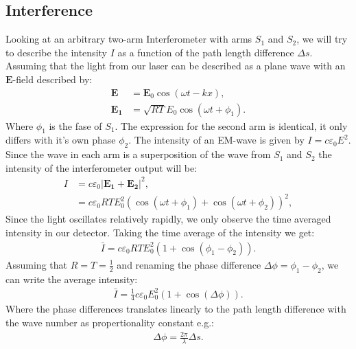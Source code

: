 \subsection{Interference}
Looking at an arbitrary two-arm Interferometer with arms $S_1$ and $S_2$, we will try to describe the intensity $I$ as a function of the path length difference $\Delta s$. Assuming that the light from our laser can be described as a plane wave with an  $\textbf{E}$-field described by:
%
\begin{align}
\mathbf{E} & =\mathbf{E}_0 \cos(\omega t-kx),
\label{efelt}\\
%
%
\mathbf{E_1} & = \sqrt{RT}E_0\cos(\omega t+\phi_1).
	\label{Earm}
\end{align}
%
Where $\phi_1$ is the fase of $S_1$. The expression for the second arm is identical, it only differs with it's own phase $\phi_2$. The intensity of an EM-wave is given by $I=c\varepsilon_0 E^2$. Since the wave in each arm is a superposition of the wave from $S_1$ and $S_2$ the intensity of the interferometer output will be:
%
\begin{align}
    I & = c\varepsilon_0 |\mathbf{E_1}+\mathbf{E_2}|^2,\\
    & =c\varepsilon_0 RTE_{0}^2 (\cos(\omega t +\phi_1)+\cos(\omega t+\phi_2))^2,
\label{intensity1}
\end{align}
%
Since the light oscillates relatively rapidly, we only observe the time averaged intensity in our detector. Taking the time average of the intensity we get:
%
\begin{align}
\bar{I}=c\varepsilon_0 RTE_{0}^2(1+\cos(\phi_1-\phi_2)).
\label{intensityav1}
\end{align}
%
Assuming that $R=T=\frac{1}{2}$ and renaming the phase difference $\Delta \phi=\phi_1-\phi_2$, we can write the average intensity:
%
\begin{align}
    \bar{I}=\frac{1}{4}c\varepsilon_0 E_{0}^2(1+\cos(\Delta \phi)).
\label{intensityav2}
\end{align}
%
Where the phase differences translates linearly to the path length difference with the wave number as propertionality constant e.g.:
%
\begin{align}
    \Delta \phi = \frac{2\pi}{\lambda}\Delta s.
\label{phasetrans}
\end{align}
%
